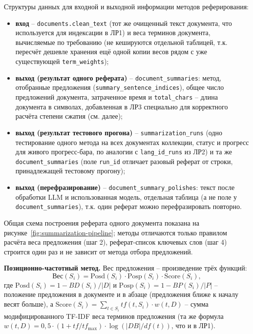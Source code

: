 
Структуры данных для входной и выходной информации методов
реферирования:
\begin{itemize}
  \item \textbf{вход} -- \texttt{documents.clean\_text} (тот же
  очищенный текст документа, что используется для индексации в ЛР1) и
  веса терминов документа, вычисляемые по требованию (не кешируются
  отдельной таблицей, т.к. пересчёт дешевле хранения ещё одной копии
  весов рядом с уже существующей \texttt{term\_weights});
  \item \textbf{выход (результат одного реферата)} --
  \texttt{document\_summaries}: метод, отобранные предложения
  (\texttt{summary\_sentence\_indices}), общее число предложений
  документа, затраченное время и \texttt{total\_chars} -- длина
  документа в символах, добавленная в ЛР3 специально для корректного
  расчёта степени сжатия (см. далее);
  \item \textbf{выход (результат тестового прогона)} --
  \texttt{summarization\_runs} (одно тестирование одного метода на
  всех документах коллекции, статус и прогресс для живого
  прогресс-бара, по аналогии с \texttt{lang\_id\_runs} из ЛР2) и та же
  \texttt{document\_summaries} (поле \texttt{run\_id} отличает разовый
  реферат от строки, принадлежащей тестовому прогону);
  \item \textbf{выход (перефразирование)} --
  \texttt{document\_summary\_polishes}: текст после обработки LLM и
  использованная модель, отдельная таблица (а не поле у
  \texttt{document\_summaries}), т.к. один реферат можно
  перефразировать повторно.
\end{itemize}

\newpage
{}

Общая схема построения реферата одного документа показана на
рисунке~\ref{fig:summarization-pipeline}; методы отличаются только
правилом расчёта веса предложения (шаг 2), реферат-список ключевых
слов (шаг 4) строится один раз и не зависит от метода отбора
предложений.


\textbf{Позиционно-частотный метод.} Вес предложения -- произведение трёх
функций:
\begin{equation}
  \text{Вес}(S_i) = \mathrm{Posd}(S_i) \cdot \mathrm{Posp}(S_i) \cdot \mathrm{Score}(S_i),
\end{equation}
где $\mathrm{Posd}(S_i) = 1 - BD(S_i)/|D|$ и $\mathrm{Posp}(S_i) = 1 -
BP(S_i)/|P|$ -- положение предложения в документе и в абзаце
(предложения ближе к началу весят больше), а $\mathrm{Score}(S_i) =
\sum_{t \in S_i} tf(t, S_i) \cdot w(t, D)$ -- сумма модифицированного
TF-IDF веса терминов предложения (та же формула $w(t,D) = 0{,}5 \cdot
(1 + tf/tf_{\max}) \cdot \log(|DB|/df(t))$, что и в ЛР1).

